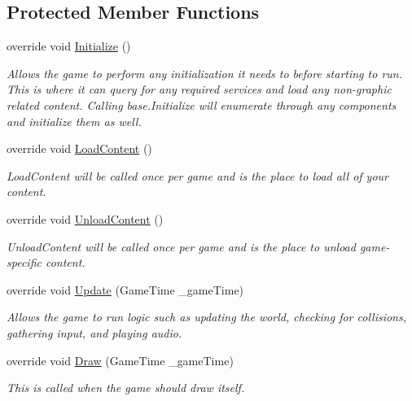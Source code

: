 \subsection*{Protected Member Functions}
\begin{DoxyCompactItemize}
\item 
override void \mbox{\hyperlink{class_g_m_t_b_1_1_kernel_a9d856326e2bed95a07e2b61ba9a65c71}{Initialize}} ()
\begin{DoxyCompactList}\small\item\em Allows the game to perform any initialization it needs to before starting to run. This is where it can query for any required services and load any non-\/graphic related content. Calling base.\+Initialize will enumerate through any components and initialize them as well. \end{DoxyCompactList}\item 
override void \mbox{\hyperlink{class_g_m_t_b_1_1_kernel_a71a7710df9a072c576ca05e3fcf3e8fa}{Load\+Content}} ()
\begin{DoxyCompactList}\small\item\em Load\+Content will be called once per game and is the place to load all of your content. \end{DoxyCompactList}\item 
override void \mbox{\hyperlink{class_g_m_t_b_1_1_kernel_a8e187a7d6a05fbf9e3b64d980cd6c221}{Unload\+Content}} ()
\begin{DoxyCompactList}\small\item\em Unload\+Content will be called once per game and is the place to unload game-\/specific content. \end{DoxyCompactList}\item 
override void \mbox{\hyperlink{class_g_m_t_b_1_1_kernel_a73b85a95594cb724d4a623ba61405e4d}{Update}} (Game\+Time \+\_\+game\+Time)
\begin{DoxyCompactList}\small\item\em Allows the game to run logic such as updating the world, checking for collisions, gathering input, and playing audio. \end{DoxyCompactList}\item 
override void \mbox{\hyperlink{class_g_m_t_b_1_1_kernel_a78938893a17a15dfda040fe7a644a5ec}{Draw}} (Game\+Time \+\_\+game\+Time)
\begin{DoxyCompactList}\small\item\em This is called when the game should draw itself. \end{DoxyCompactList}\end{DoxyCompactItemize}
